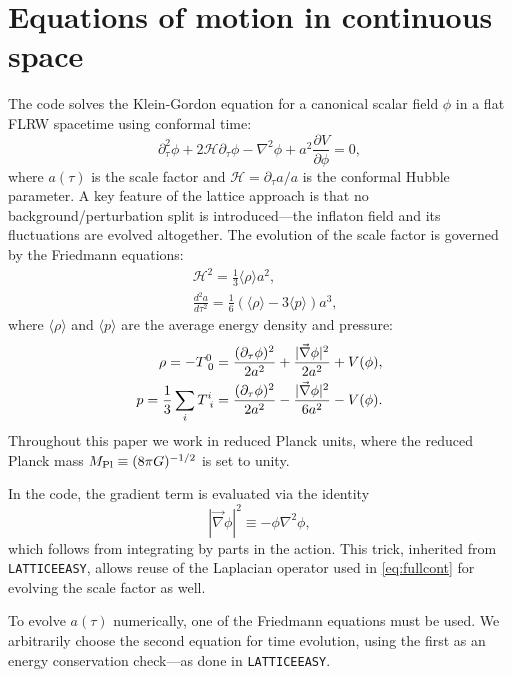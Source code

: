 \documentclass[aps, nofootinbib,superscriptaddress, preprintnumbers, longbibliography]{article}
\begin{document}
\section{Equations of motion in continuous space}
\label{sec:eoms}
The code solves the Klein-Gordon equation for a canonical scalar field $\phi$ in a flat FLRW spacetime using conformal time:
\begin{equation}
\label{eq:fullcont}
\partial_\tau^2\phi + 2\mathcal{H}\partial_\tau \phi - \nabla^2\phi + a^2\frac{\partial V}{\partial \phi} = 0,
\end{equation}
where $a(\tau)$ is the scale factor and $\mathcal{H} = \partial_\tau a / a$ is the conformal Hubble parameter. A key feature of the lattice approach is that no background/perturbation split is introduced—the inflaton field and its fluctuations are evolved altogether.
The evolution of the scale factor is governed by the Friedmann equations:
\begin{align}
\label{eq:friedmann}
&\mathcal{H}^2 = \frac{1}{3} \langle \rho \rangle a^2,\\
&\frac{d^2a}{d\tau^2} = \frac{1}{6} \left(\langle \rho \rangle - 3 \langle p \rangle\right) a^3,
\end{align}
where $\langle \rho \rangle$ and $\langle p \rangle$ are the average energy density and pressure:
\begin{equation}
\begin{split}
\rho = -T^0_{\hspace{1mm}0} = \frac{(\partial_\tau\phi)^2}{2a^2} + \frac{|\vec\nabla\phi|^2}{2a^2} + V(\phi),\\
p = \frac{1}{3} \sum_i T^i_{\hspace{1mm}i} = \frac{(\partial_\tau\phi)^2}{2a^2} - \frac{|\vec\nabla\phi|^2}{6a^2} - V(\phi).
\end{split}
\label{eq:ED}
\end{equation}
Throughout this paper we work in reduced Planck units, where the reduced Planck mass
$M_{\rm Pl} \equiv (8\pi G)^{-1/2}$ is set to unity.

In the code, the gradient term is evaluated via the identity
\[
|\vec\nabla\phi|^2 \equiv -\phi \nabla^2\phi,
\]
which follows from integrating by parts in the action. This trick, inherited from \texttt{LATTICEEASY}, allows reuse of the Laplacian operator used in \cref{eq:fullcont} for evolving the scale factor as well.

To evolve $a(\tau)$ numerically, one of the Friedmann equations must be used. We arbitrarily choose the second equation for time evolution, using the first as an energy conservation check—as done in \texttt{LATTICEEASY}.
\end{document}
